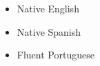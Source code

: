 
  \begin{itemize}
    \setlength\itemsep{-0.3em}
    \item Native English 
    \item Native Spanish 
    \item Fluent Portuguese
  \end{itemize}

% 
% 
%   
